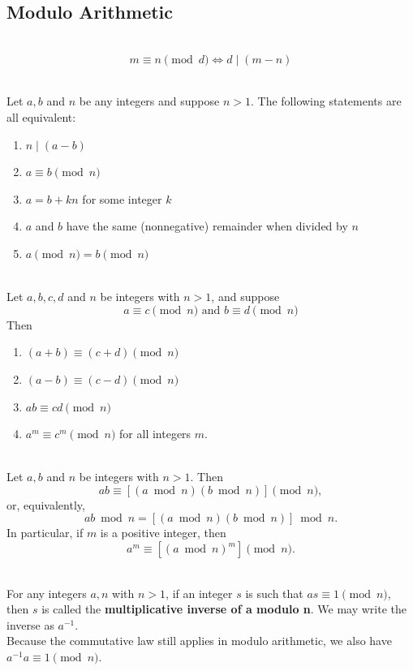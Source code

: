 \documentclass[12pt]{article}
\begin{document}
\subsection{Modulo Arithmetic}
\begin{definition}[4.7.1]
\hfill\\
\[m \equiv n \pmod{ d} \Leftrightarrow d \mid (m - n)\]
\end{definition}
\begin{theorem}[8.4.1(Epp)]
\hfill\\
\normalfont Let $a, b$ and $n$ be any integers and suppose $n > 1$. The following statements are all
equivalent:
\begin{enumerate}
\item $n \mid(a - b)$
\item $a \equiv b \pmod{n}$
\item $a = b + kn$ for some integer $k$
\item $a$ and $b$ have the same (nonnegative) remainder when divided by $n$
\item $a \pmod{n}= b\pmod{n}$
\end{enumerate}
\end{theorem}
\begin{theorem}[8.4.3(Epp)]
\hfill\\
\normalfont Let $a, b, c, d$ and $n$ be integers with $n > 1$, and suppose
\[a \equiv c \pmod{n} \text{ and } b \equiv d \pmod{n}\]
Then
\begin{enumerate}
\item $(a + b) \equiv (c + d) \pmod{n}$
\item $(a - b) \equiv (c - d) \pmod{n}$
\item $ab \equiv cd \pmod{n}$
\item $a^m \equiv c^m \pmod{n}$ for all integers $m$.
\end{enumerate}
\end{theorem}
\begin{corollary}[8.4.4(Epp)]
\hfill\\
\normalfont Let $a, b$ and $n$ be integers with $n > 1$. Then
\[ab \equiv [(a \bmod n)(b \bmod n)]\pmod{n},\]
or, equivalently,
\[ab \bmod n = [(a \bmod n)(b \bmod n)] \bmod n.\]
In particular, if $m$ is a positive integer, then
\[a^m \equiv [(a \bmod n)^m]\pmod{n}.\]
\end{corollary}
\begin{definition}[4.7.2]
\hfill\\
\normalfont For any integers $a, n$ with $n > 1$, if an integer $s$ is such that $as \equiv 1
\pmod{n}$, then $s$ is called the \textbf{multiplicative inverse of a modulo n}. We
may write the inverse as $a^{-1}$.\\
Because the commutative law still applies in modulo arithmetic, we also
have $a^{-1}a \equiv 1 \pmod{n}$.
\end{definition}
\end{document}
